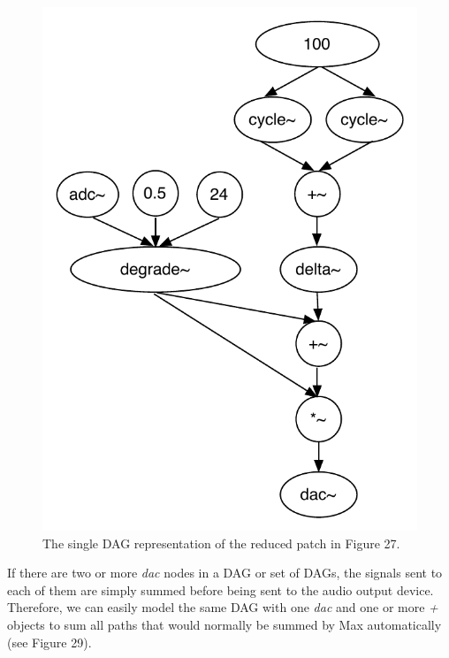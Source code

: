 \documentclass[12pt]{report} 	%
\numberwithin{figure}{chapter}
\numberwithin{table}{chapter}
\numberwithin{equation}{chapter}
\begin{document}
\begin{flushleft}
\begin{figure}[h!]
\begin{center}
\includegraphics[scale=0.8]{MaxDAGsSendReceive2}
\caption[Reducing a set of DAGs to a single DAG]{The single DAG representation of the reduced patch in Figure 27.}
\end{center}
\vspace{6pt}
\end{figure}
If there are two or more \textit{dac\texttildelow{}} nodes in a DAG or set of DAGs, the signals sent to each of them are simply summed before being sent to the audio output device. Therefore, we can easily model the same DAG with one \textit{dac\texttildelow{}} and one or more \textit{+\texttildelow{}} objects to sum all paths that would normally be summed by Max automatically (see Figure 29). 
\begin{figure}[h!]
\begin{center}

\end{center}
\end{figure}
\end{flushleft}
\end{document}
